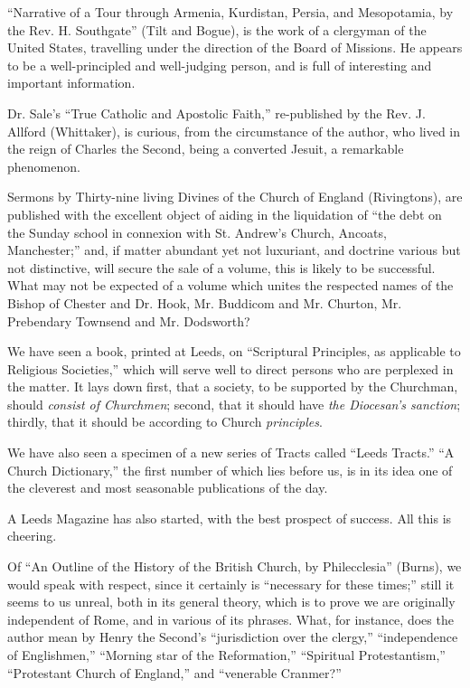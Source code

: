 ``Narrative of a Tour through Armenia, Kurdistan,
Persia, and Mesopotamia, by the Rev. H. Southgate'' (Tilt and Bogue), is
the work of a clergyman of the United States, travelling under the
direction of the Board of Missions. He appears to be a well-principled
and well-judging person, and is full of interesting and important
information.

Dr. Sale's ``True Catholic and Apostolic Faith,''
re-published by the Rev. J. Allford (Whittaker), is curious, from the
circumstance of the author, who lived in the reign of Charles the
Second, being a converted Jesuit, a remarkable phenomenon.

Sermons by Thirty-nine living Divines of the Church
of England (Rivingtons), are published with the excellent object of
aiding in the liquidation of ``the debt on the Sunday school in connexion
with St. Andrew's Church, Ancoats, Manchester;'' and, if matter abundant
yet not luxuriant, and doctrine various but not distinctive, will secure
the sale of a volume, this is likely to be successful. What may not be
expected of a volume which unites the respected names of the Bishop of
Chester and Dr. Hook, Mr. Buddicom and Mr. Churton, Mr. Prebendary
Townsend and Mr. Dodsworth?

We have seen a book, printed at Leeds, on ``Scriptural
Principles, as applicable to Religious Societies,'' which will serve well
to direct persons who are perplexed in the matter. It lays down first,
that a society, to be supported by the Churchman, should \emph{consist of
Churchmen}; second, that it should have \emph{the Diocesan's sanction};
thirdly, that it should be according to Church \emph{principles}.

We have also seen a specimen of a new series of
Tracts called ``Leeds Tracts.'' ``A Church Dictionary,'' the first number of
which lies before us, is in its idea one of the cleverest and most
seasonable publications of the day.

A Leeds Magazine has also started, with the best
prospect of success. All this is cheering.

Of ``An Outline of the History of the British
Church, by Philecclesia'' (Burns), we would speak with respect, since it
certainly is ``necessary for these times;'' still it seems to us unreal,
both in its general theory, which is to prove we are originally
independent of Rome, and in various of its phrases. What, for instance,
does the author mean by Henry the Second's ``jurisdiction over the
clergy,'' ``independence of Englishmen,'' ``Morning star of the Reformation,''
``Spiritual Protestantism,'' ``Protestant Church of England,'' and ``venerable
Cranmer?''

